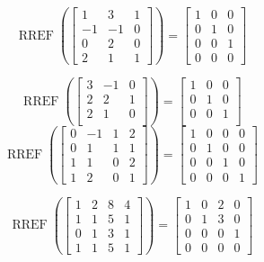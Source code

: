 \documentclass{article}
\DeclareMathOperator{\RREF}{RREF}
\begin{document}
\[
  \RREF\left(\begin{bmatrix}
    1 & 3 & 1 \\
    -1 & -1 & 0 \\
    0 & 2 & 0 \\
    2 & 1 & 1
  \end{bmatrix} \right) =
  \begin{bmatrix}
    1 & 0 & 0 \\
    0 & 1 & 0 \\
    0 & 0 & 1 \\
    0 & 0 & 0
  \end{bmatrix}
\]

\[
  \RREF\left(\begin{bmatrix}
    3 & -1 & 0 \\
    2 & 2 & 1 \\
    2 & 1 & 0 \\
  \end{bmatrix} \right) =
  \begin{bmatrix}
    1 & 0 & 0  \\
    0 & 1 & 0 \\
    0 & 0 & 1 \\
  \end{bmatrix}
\]
%
%
\[
  \RREF\left(\begin{bmatrix}
    0 & -1 & 1 & 2 \\
    0 & 1 & 1 & 1 \\
    1 & 1 & 0 & 2 \\
    1 & 2 & 0 & 1
  \end{bmatrix} \right) =
  \begin{bmatrix}
    1 & 0 & 0 & 0 \\
    0 & 1 & 0 & 0 \\
    0 & 0 & 1 & 0 \\
    0 & 0 & 0 & 1
  \end{bmatrix}
\]
%



\[\RREF \left( 
\begin{bmatrix} 
1 & 2 & 8 & 4 \\ 
1 & 1 & 5 & 1 \\ 
0 & 1 & 3 & 1 \\ 
1 & 1 & 5 & 1 
\end{bmatrix} \right) = 
\begin{bmatrix} 
1 & 0 & 2 & 0 \\ 
0 & 1 & 3 & 0 \\ 
0 & 0 & 0 & 1 \\ 
0 & 0 & 0 & 0
\end{bmatrix}\]
\end{document}
